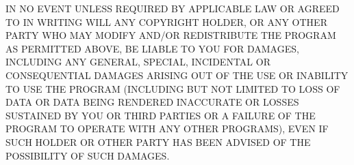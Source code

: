 IN NO EVENT UNLESS REQUIRED BY APPLICABLE LAW OR AGREED TO IN WRITING WILL ANY
COPYRIGHT HOLDER, OR ANY OTHER PARTY WHO MAY MODIFY AND/OR REDISTRIBUTE THE
PROGRAM AS PERMITTED ABOVE, BE LIABLE TO YOU FOR DAMAGES, INCLUDING ANY
GENERAL, SPECIAL, INCIDENTAL OR CONSEQUENTIAL DAMAGES ARISING OUT OF THE USE
OR INABILITY TO USE THE PROGRAM (INCLUDING BUT NOT LIMITED TO LOSS OF DATA OR
DATA BEING RENDERED INACCURATE OR LOSSES SUSTAINED BY YOU OR THIRD PARTIES OR
A FAILURE OF THE PROGRAM TO OPERATE WITH ANY OTHER PROGRAMS), EVEN IF SUCH
HOLDER OR OTHER PARTY HAS BEEN ADVISED OF THE POSSIBILITY OF SUCH DAMAGES.
